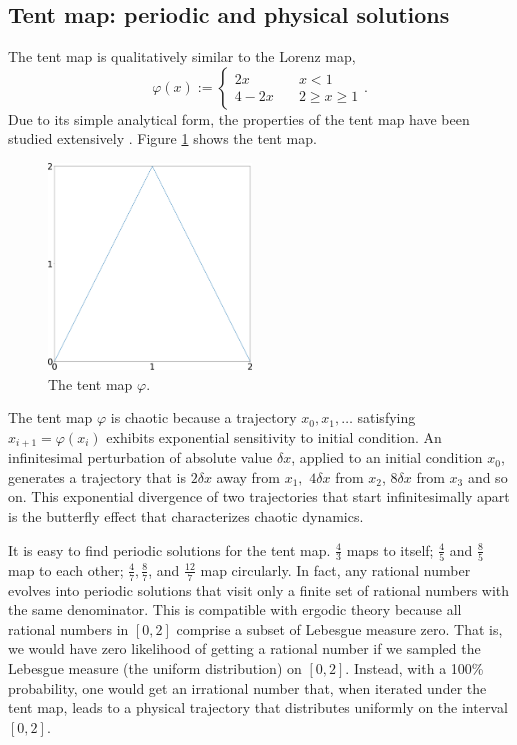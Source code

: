 \documentclass[preprint,12pt]{elsarticle}
\begin{document}
\subsection{Tent map: periodic and physical solutions}
\label{sec:tent}
The tent map is qualitatively similar
to the Lorenz map,
\begin{equation} \label{tentmap}
    \varphi(x) := \begin{cases}
    2x \quad & x < 1 \\
    4 - 2x \quad & 2 \ge x \ge 1
    \end{cases}.
\end{equation}
Due to its simple analytical form, the properties of the tent map have been studied extensively \cite{tent1}\cite{tent2}. Figure \ref{fig:tent_map} shows the tent map.
\begin{figure}\centering
\includegraphics[width=0.48\textwidth]{tent_map.png}
\caption{The tent map $\varphi$.}
\label{fig:tent_map}
\end{figure}

The tent map $\varphi$ is chaotic because a trajectory $x_0,x_1,\ldots$ satisfying
$x_{i+1} = \varphi(x_i)$ exhibits exponential sensitivity to initial condition. An infinitesimal perturbation of absolute value $\delta x$, applied to an initial condition $x_0$, generates a trajectory that is $2 \delta x$ away from $x_1,$ $4 \delta x$ from $x_2$, $8 \delta x$ from $x_3$ and so on. This exponential divergence of two trajectories that start infinitesimally apart is the butterfly effect that characterizes
chaotic dynamics.

It is easy to find periodic solutions for the tent map.
$\frac43$ maps to itself; $\frac45$ and $\frac85$ map to each other;
$\frac47, \frac87$, and $\frac{12}7$ map circularly.  In fact, any rational number evolves into periodic solutions that visit
only a finite set of rational numbers with the same denominator.
This is compatible
with ergodic theory because all rational numbers in $[0,2]$ comprise a subset of Lebesgue measure zero. That is, we would have zero likelihood of getting a
rational number if we sampled the Lebesgue measure (the uniform distribution) on $[0,2]$.  Instead, with a 100\% probability, one would get an irrational number
that, when iterated under the tent map, leads to a physical trajectory that distributes uniformly on the interval $[0,2]$.
\end{document}

